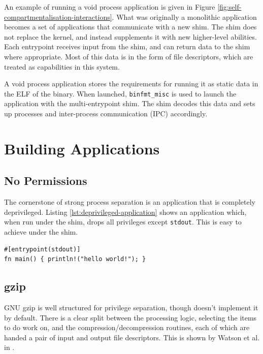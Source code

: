 \documentclass[sigplan]{acmart}
\begin{document}
An example of running a void process application is given in Figure \ref{fig:self-compartmentalisation-interactions}. What was originally a monolithic application becomes a set of applications that communicate with a new shim. The shim does not replace the kernel, and instead supplements it with new higher-level abilities. Each entrypoint receives input from the shim, and can return data to the shim where appropriate. Most of this data is in the form of file descriptors, which are treated as capabilities in this system.

A void process application stores the requirements for running it as static data in the ELF of the binary. When launched, \texttt{binfmt\_misc} is used to launch the application with the multi-entrypoint shim. The shim decodes this data and sets up processes and inter-process communication (IPC) accordingly.


\section{Building Applications}

\subsection{No Permissions}

The cornerstone of strong process separation is an application that is completely deprivileged. Listing \ref{lst:deprivileged-application} shows an application which, when run under the shim, drops all privileges except \texttt{stdout}. This is easy to achieve under the shim.

\begin{lstlisting}[float,label={lst:deprivileged-application}]
#[entrypoint(stdout)]
fn main() { println!("hello world!"); }
\end{lstlisting}

\subsection{gzip}

GNU gzip \citep{gailly_gzip_2020} is well structured for privilege separation, though doesn't implement it by default. There is a clear split between the processing logic, selecting the items to do work on, and the compression/decompression routines, each of which are handed a pair of input and output file descriptors. This is shown by Watson et al. in \cite{watson_capsicum_2010}.
\end{document}
